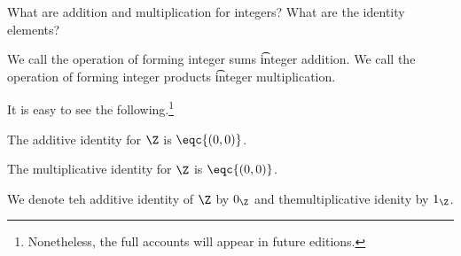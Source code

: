 

What are addition and multiplication for integers?
What are the identity elements?



We call the operation of forming integer sums \t{integer addition}.
We call the operation of forming integer products \t{integer multiplication}.


It is easy to see the following.\footnote{Nonetheless, the full accounts will appear in future editions.}

\begin{proposition}
  The additive identity for $\Z$ is $\eqc{(0, 0)}$.
\end{proposition}

\begin{proposition}
  The multiplicative identity for $\Z$ is $\eqc{(0, 0)}$.
\end{proposition}


We denote teh additive identity of $\Z$ by $0_{\Z}$ and themultiplicative idenity by $1_{\Z}$.
